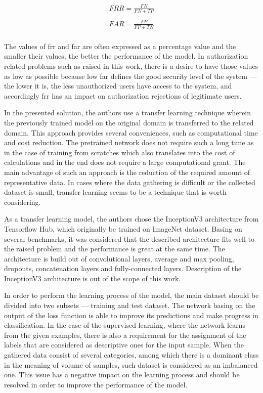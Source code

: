 \begin{gather*}
    FRR = \frac{FN}{FN + TP}\\
    \\
    FAR = \frac{FP}{FP + TN}\\
\end{gather*}

The values of \gls{frr} and \gls{far} are often expressed as a percentage value and the smaller their values, the better the performance of the model.
In authorization related problems such as raised in this work, there is a desire to have those values as low as possible because low \gls{far} defines the good security level of the system --- the lower it is, the less unauthorized users have access to the system, and accordingly \gls{frr} has an impact on authorization rejections of legitimate users.

In the presented solution, the authors use a transfer learning technique wherein the previously trained model on the original domain is transferred to the related domain.
This approach provides several conveniences, such as computational time and cost reduction.
The pretrained network does not require such a long time as in the case of training from scratches which also translates into the cost of calculations and in the end does not require a large computational grant.
The main advantage of such an approach is the reduction of the required amount of representative data.
In cases where the data gathering is difficult or the collected dataset is small, transfer learning seems to be a technique that is worth considering.

As a transfer learning model, the authors chose the InceptionV3 architecture from Tensorflow Hub, which originally be trained on ImageNet dataset.
Basing on several benchmarks, it was considered that the described architecture fits well to the raised problem and the performance is great at the same time.
The architecture is build out of convolutional layers, average and max pooling, dropouts, concatenation layers and fully-connected layers.
Description of the InceptionV3 architecture is out of the scope of this work.

In order to perform the learning process of the model, the main dataset should be divided into two subsets --- training and test dataset.
The network basing on the output of the loss function is able to improve its predictions and make progress in classification.
In the case of the supervised learning, where the network learns from the given examples, there is also a requirement for the assignment of the labels that are considered as descriptive ones for the input sample.
When the gathered data consist of several categories, among which there is a dominant class in the meaning of volume of samples, such dataset is considered as an imbalanced one.
This issue has a negative impact on the learning process and should be resolved in order to improve the performance of the model.
